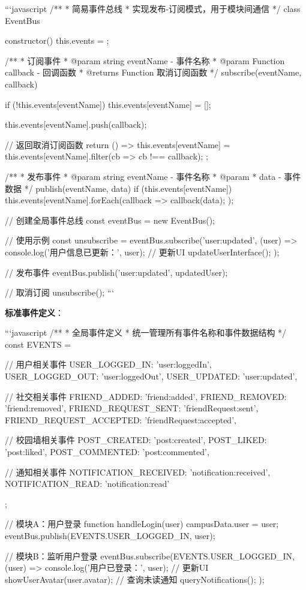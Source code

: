 \documentclass[12pt,a4paper]{article}
\begin{document}
```javascript
/**
 * 简易事件总线
 * 实现发布-订阅模式，用于模块间通信
 */
class EventBus {
  constructor() {
    this.events = {};
  }

  /**
   * 订阅事件
   * @param {string} eventName - 事件名称
   * @param {Function} callback - 回调函数
   * @returns {Function} 取消订阅函数
   */
  subscribe(eventName, callback) {
    if (!this.events[eventName]) {
      this.events[eventName] = [];
    }

    this.events[eventName].push(callback);

    // 返回取消订阅函数
    return () => {
      this.events[eventName] = this.events[eventName].filter(cb => cb !== callback);
    };
  }

  /**
   * 发布事件
   * @param {string} eventName - 事件名称
   * @param {*} data - 事件数据
   */
  publish(eventName, data) {
    if (this.events[eventName]) {
      this.events[eventName].forEach(callback => {
        callback(data);
      });
    }
  }
}

// 创建全局事件总线
const eventBus = new EventBus();

// 使用示例
const unsubscribe = eventBus.subscribe('user:updated', (user) => {
  console.log('用户信息已更新：', user);
  // 更新UI
  updateUserInterface();
});

// 发布事件
eventBus.publish('user:updated', updatedUser);

// 取消订阅
unsubscribe();
```

\textbf{标准事件定义}：

```javascript
/**
 * 全局事件定义
 * 统一管理所有事件名称和事件数据结构
 */
const EVENTS = {
  // 用户相关事件
  USER_LOGGED_IN: 'user:loggedIn',
  USER_LOGGED_OUT: 'user:loggedOut',
  USER_UPDATED: 'user:updated',

  // 社交相关事件
  FRIEND_ADDED: 'friend:added',
  FRIEND_REMOVED: 'friend:removed',
  FRIEND_REQUEST_SENT: 'friendRequest:sent',
  FRIEND_REQUEST_ACCEPTED: 'friendRequest:accepted',

  // 校园墙相关事件
  POST_CREATED: 'post:created',
  POST_LIKED: 'post:liked',
  POST_COMMENTED: 'post:commented',

  // 通知相关事件
  NOTIFICATION_RECEIVED: 'notification:received',
  NOTIFICATION_READ: 'notification:read'
};

// 模块A：用户登录
function handleLogin(user) {
  campusData.user = user;
  eventBus.publish(EVENTS.USER_LOGGED_IN, user);
}

// 模块B：监听用户登录
eventBus.subscribe(EVENTS.USER_LOGGED_IN, (user) => {
  console.log('用户已登录：', user);
  // 更新UI
  showUserAvatar(user.avatar);
  // 查询未读通知
  queryNotifications();
});
\end{document}
